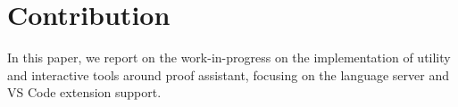 
\section{Contribution}

In this paper, we report on the work-in-progress on the implementation of
utility and interactive tools around \Rzk{} proof assistant, focusing on
the language server and VS Code extension support.
